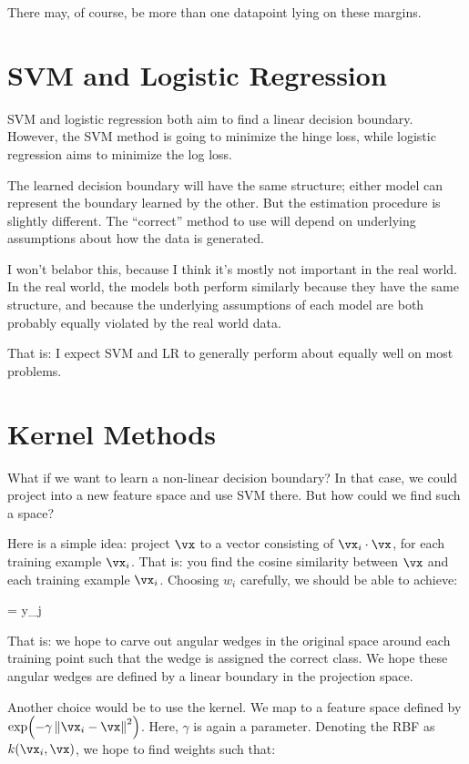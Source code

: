 \documentclass[11pt, oneside]{amsart}
\begin{document}
There may, of course, be more than one datapoint lying on these margins.

\section{SVM and Logistic Regression}

SVM and logistic regression both aim to find a linear decision boundary.
However, the SVM method is going to minimize the hinge loss, while
logistic regression aims to minimize the log loss.

The learned decision boundary will have the same structure; either model
can represent the boundary learned by the other. But the estimation
procedure is slightly different. The ``correct'' method to use will
depend on underlying assumptions about how the data is generated.

I won't belabor this, because I think it's mostly not important in the
real world. In the real world, the models both perform similarly because
they have the same structure, and because the underlying assumptions of
each model are both probably equally violated by the real world data.

That is: I expect SVM and LR to generally perform about equally well on
most problems.

\section{Kernel Methods}

What if we want to learn a non-linear decision boundary? In that case,
we could project into a new feature space and use SVM there. But how
could we find such a space?

Here is a simple idea: project $\vx$ to a vector consisting of $\vx_i
\cdot \vx$, for each training example $\vx_i$. That is: you find the
cosine similarity between $\vx$ and each training example $\vx_i$.
Choosing $w_i$ carefully, we should be able to achieve:

\begin{nedqn}
   = y_j
\end{nedqn}

That is: we hope to carve out angular wedges in the original space
around each training point such that the wedge is assigned the correct
class. We hope these angular wedges are defined by a linear boundary in
the projection space.

Another choice would be to use the 
kernel. We map to a feature space defined by $\expf{-\gamma
\normsq{\vx_i - \vx}}$. Here, $\gamma$ is again a parameter. Denoting
the RBF as $k(\vx_i, \vx)$, we hope to find weights such that:
\end{document}
